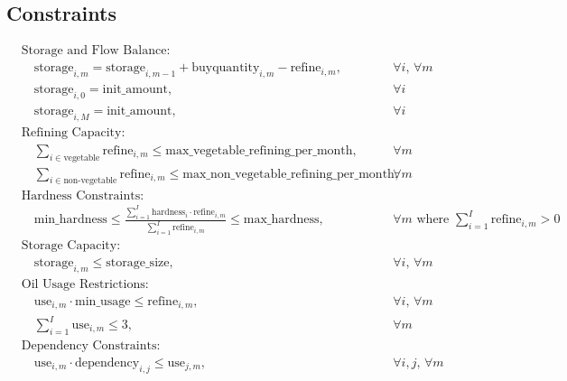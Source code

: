 \documentclass{article}
\begin{document}
\subsection*{Constraints}
\begin{align*}
    &\text{Storage and Flow Balance:} &\\
    &\quad \text{storage}_{i,m} = \text{storage}_{i,m-1} + \text{buyquantity}_{i,m} - \text{refine}_{i,m}, &\forall i,\, \forall m \\
    &\quad \text{storage}_{i,0} = \text{init\_amount}, &\forall i \\
    &\quad \text{storage}_{i,M} = \text{init\_amount}, &\forall i \\

    &\text{Refining Capacity:} &\\
    &\quad \sum_{i \in \text{vegetable}} \text{refine}_{i,m} \leq \text{max\_vegetable\_refining\_per\_month}, &\forall m \\
    &\quad \sum_{i \in \text{non-vegetable}} \text{refine}_{i,m} \leq \text{max\_non\_vegetable\_refining\_per\_month}, &\forall m \\

    &\text{Hardness Constraints:} & \\
    &\quad \text{min\_hardness} \leq \frac{\sum_{i=1}^{I} \text{hardness}_i \cdot \text{refine}_{i,m}}{\sum_{i=1}^{I} \text{refine}_{i,m}} \leq \text{max\_hardness}, &\forall m \text{ where } \sum_{i=1}^{I} \text{refine}_{i,m} > 0 \\

    &\text{Storage Capacity:} &\\
    &\quad \text{storage}_{i,m} \leq \text{storage\_size}, &\forall i,\, \forall m \\

    &\text{Oil Usage Restrictions:} &\\
    &\quad \text{use}_{i,m} \cdot \text{min\_usage} \leq \text{refine}_{i,m}, &\forall i,\, \forall m \\
    &\quad \sum_{i=1}^{I} \text{use}_{i,m} \leq 3, &\forall m \\

    &\text{Dependency Constraints:} &\\
    &\quad \text{use}_{i,m} \cdot \text{dependency}_{i,j} \leq \text{use}_{j,m}, &\forall i,j,\, \forall m \\
\end{align*}
\end{document}
